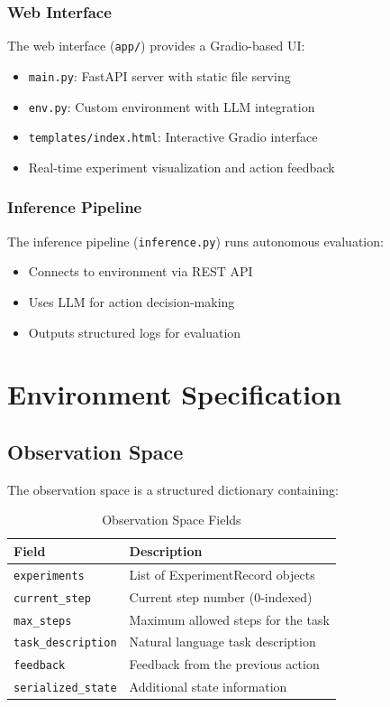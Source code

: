 \documentclass[12pt,a4paper]{article}
\begin{document}
\subsubsection{Web Interface}
The web interface (\texttt{app/}) provides a Gradio-based UI:
\begin{itemize}
	\item \texttt{main.py}: FastAPI server with static file serving
	\item \texttt{env.py}: Custom environment with LLM integration
	\item \texttt{templates/index.html}: Interactive Gradio interface
	\item Real-time experiment visualization and action feedback
\end{itemize}

\subsubsection{Inference Pipeline}
The inference pipeline (\texttt{inference.py}) runs autonomous evaluation:
\begin{itemize}
	\item Connects to environment via REST API
	\item Uses LLM for action decision-making
	\item Outputs structured logs for evaluation
\end{itemize}

\section{Environment Specification}

\subsection{Observation Space}

The observation space is a structured dictionary containing:

\begin{table}[H]
	\centering
	\caption{Observation Space Fields}
	\begin{tabular}{@{}lp{10cm}@{}}
		\toprule
		\textbf{Field}             & \textbf{Description}               \\
		\midrule
		\texttt{experiments}       & List of ExperimentRecord objects   \\
		\texttt{current\_step}     & Current step number (0-indexed)    \\
		\texttt{max\_steps}        & Maximum allowed steps for the task \\
		\texttt{task\_description} & Natural language task description  \\
		\texttt{feedback}          & Feedback from the previous action  \\
		\texttt{serialized\_state} & Additional state information       \\
		\bottomrule
	\end{tabular}
\end{table}
\end{document}
